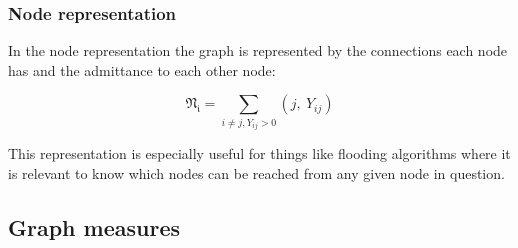 \subsubsection{Node representation}

In the node representation the graph is represented by the connections
each node has and the admittance to each other node:

\begin{equation}
    \mathfrak{N_i} = \sum_{i \ne j, Y_{ij} > 0} (j, \ Y_{ij}) 
\end{equation}

This representation is especially useful for things like flooding algorithms where it is
relevant to know which nodes can be reached from any given node in question. 

\subsection{Graph measures}